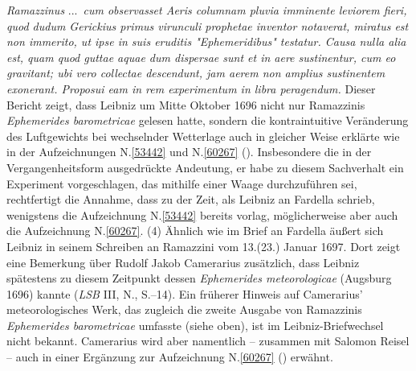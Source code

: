 \textit{Ramazzinus} \lbrack...\rbrack\ \textit{cum observasset Aeris columnam pluvia imminente leviorem fieri, quod dudum Gerickius primus virunculi prophetae inventor notaverat, miratus est non immerito, ut ipse in suis eruditis "Ephemeridibus" testatur. Causa nulla alia est, quam quod guttae aquae dum dispersae sunt et in aere sustinentur, cum eo gravitant; ubi vero collectae descendunt, jam aerem non amplius sustinentem exonerant. Proposui eam in rem experimentum in libra peragendum.}
Dieser Bericht zeigt, dass Leibniz um Mitte Oktober 1696 nicht nur Ramazzinis \textit{Ephemerides barometricae}\cite{01516}\cite{01517} gelesen hatte, sondern die kontraintuitive Veränderung des Luftgewichts bei wechselnder Wetterlage auch in gleicher Weise erklärte wie in der Aufzeichnungen N.\;\ref{53442} und N.\;\ref{60267} ().
Insbesondere die in der Vergangenheitsform ausgedrückte Andeutung, er habe zu diesem Sachverhalt ein Experiment vorgeschlagen, das mithilfe einer Waage durchzuführen sei, rechtfertigt die Annahme, dass zu der Zeit, als Leibniz an Fardella schrieb, wenigstens die Aufzeichnung N.\;\ref{53442} bereits vorlag, möglicherweise aber auch die Aufzeichnung N.\;\ref{60267}.
\pend%
\pstart%
(4)
Ähnlich wie im Brief an Fardella äußert sich Leibniz in seinem Schreiben an Ramazzini vom 13.\;(23.) Januar 1697.\cite{01444}
Dort zeigt eine Bemerkung über Rudolf Jakob Camerarius zusätzlich, dass Leibniz spätestens zu diesem Zeitpunkt dessen \textit{Ephemerides meteorologicae} (Augsburg 1696)\cite{01445} kannte (\textit{LSB} III, N., S.--14).\cite{01444}
Ein früherer Hinweis auf Camerarius' meteorologisches Werk,\cite{01445} das zugleich die zweite Ausgabe von Ramazzinis \textit{Ephemerides barometricae}\cite{01517} umfasste (siehe oben), ist im Leibniz-Briefwechsel nicht bekannt.
Camerarius wird aber namentlich -- zusammen mit Salomon Reisel -- auch in einer Ergänzung zur Aufzeichnung N.\;\ref{60267} () erwähnt.
